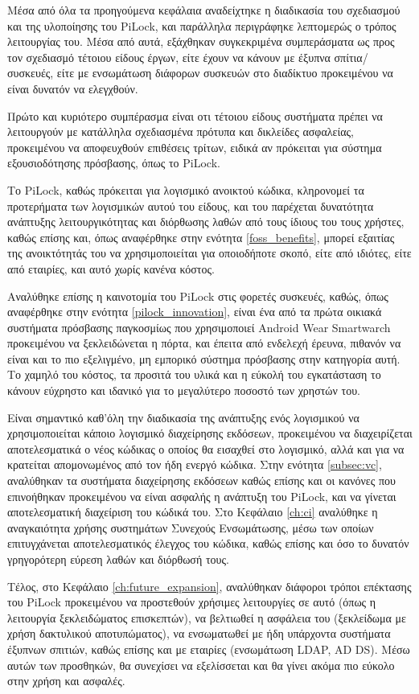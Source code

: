Μέσα από όλα τα προηγούμενα κεφάλαια αναδείχτηκε η διαδικασία του σχεδιασμού και της υλοποίησης του PiLock, και παράλληλα περιγράφηκε λεπτομερώς ο τρόπος λειτουργίας του. Μέσα από αυτά, εξάχθηκαν συγκεκριμένα συμπεράσματα ως προς τον σχεδιασμό τέτοιου είδους έργων, είτε έχουν να κάνουν με έξυπνα σπίτια/συσκευές, είτε με ενσωμάτωση διάφορων συσκευών στο διαδίκτυο προκειμένου να είναι δυνατόν να ελεγχθούν.

Πρώτο και κυριότερο συμπέρασμα είναι οτι τέτοιου είδους συστήματα πρέπει να λειτουργούν με κατάλληλα σχεδιασμένα πρότυπα και δικλείδες ασφαλείας, προκειμένου να αποφευχθούν επιθέσεις τρίτων, ειδικά αν πρόκειται για σύστημα εξουσιοδότησης πρόσβασης, όπως το PiLock.

Το PiLock, καθώς πρόκειται για λογισμικό ανοικτού κώδικα, κληρονομεί τα προτερήματα των λογισμικών αυτού του είδους, και του παρέχεται δυνατότητα ανάπτυξης λειτουργικότητας και διόρθωσης λαθών από τους ίδιους του τους χρήστες, καθώς επίσης και, όπως αναφέρθηκε στην ενότητα \ref{foss_benefits}, μπορεί εξαιτίας της ανοικτότητάς του να χρησιμοποιείται για οποιοδήποτε σκοπό, είτε από ιδιότες, είτε από εταιρίες, και αυτό χωρίς κανένα κόστος.

Αναλύθηκε επίσης η καινοτομία του PiLock στις φορετές συσκευές, καθώς, όπως αναφέρθηκε στην ενότητα \ref{pilock_innovation}, είναι ένα από τα πρώτα οικιακά συστήματα πρόσβασης παγκοσμίως που χρησιμοποιεί Android Wear Smartwarch προκειμένου να ξεκλειδώνεται η πόρτα, και έπειτα από ενδελεχή έρευνα, πιθανόν να είναι και το πιο εξελιγμένο, μη εμπορικό σύστημα πρόσβασης στην κατηγορία αυτή. Το χαμηλό του κόστος, τα προσιτά του υλικά και η εύκολή του εγκατάσταση το κάνουν εύχρηστο και ιδανικό για το μεγαλύτερο ποσοστό των χρηστών του.

Είναι σημαντικό καθ'όλη την διαδικασία της ανάπτυξης ενός λογισμικού να χρησιμοποιείται κάποιο λογισμικό διαχείρησης εκδόσεων, προκειμένου να διαχειρίζεται αποτελεσματικά ο νέος κώδικας ο οποίος θα εισαχθεί στο λογισμικό, αλλά και για να κρατείται απομονωμένος από τον ήδη ενεργό κώδικα. Στην ενότητα \ref{subsec:vc}, αναλύθηκαν τα συστήματα διαχείρησης εκδόσεων καθώς επίσης και οι κανόνες που επινοήθηκαν προκειμένου να είναι ασφαλής η ανάπτυξη του PiLock, και να γίνεται αποτελεσματική διαχείριση του κώδικά του. Στο Κεφάλαιο \ref{ch:ci} αναλύθηκε η αναγκαιότητα χρήσης συστημάτων Συνεχούς Ενσωμάτωσης, μέσω των οποίων επιτυγχάνεται αποτελεσματικός έλεγχος του κώδικα, καθώς επίσης και όσο το δυνατόν γρηγορότερη εύρεση λαθών και διόρθωσή τους.

Τέλος, στο Κεφάλαιο \ref{ch:future_expansion}, αναλύθηκαν διάφοροι τρόποι επέκτασης του PiLock προκειμένου να προστεθούν χρήσιμες λειτουργίες σε αυτό (όπως η λειτουργία ξεκλειδώματος επισκεπτών), να βελτιωθεί η ασφάλεια του (ξεκλείδωμα με χρήση δακτυλικού αποτυπώματος), να ενσωματωθεί με ήδη υπάρχοντα συστήματα έξυπνων σπιτιών, καθώς επίσης και με εταιρίες (ενσωμάτωση LDAP, AD DS). Μέσω αυτών των προσθηκών, θα συνεχίσει να εξελίσσεται και θα γίνει ακόμα πιο εύκολο στην χρήση και ασφαλές.